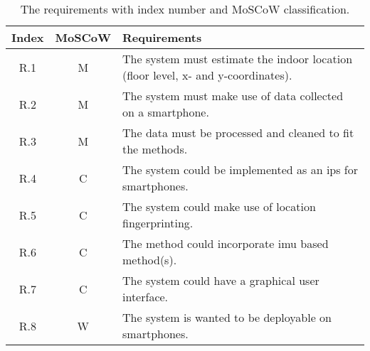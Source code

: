 \begin{table}[H]
\caption{The requirements with index number and MoSCoW classification.}
\begin{tabularx}{\textwidth}{| c | c | X |}
\hline
\textbf{Index} & \textbf{MoSCoW} & \textbf{Requirements}\\\hline
R.1 & M & The system must estimate the indoor location (floor level, x- and y-coordinates). \\\hline
R.2 & M & The system must make use of data collected on a smartphone.\\\hline
R.3 & M & The data must be processed and cleaned to fit the methods.\\\hline
R.4 & C & The system could be implemented as an \gls{ips} for smartphones.\\\hline
R.5 & C & The system could make use of location fingerprinting.\\\hline
R.6 & C & The method could incorporate \gls{imu} based method(s).\\\hline
R.7 & C & The system could have a graphical user interface.\\\hline
R.8 & W & The system is wanted to be deployable on smartphones.\\\hline
\end{tabularx}
\label{table:requirements}
\end{table}